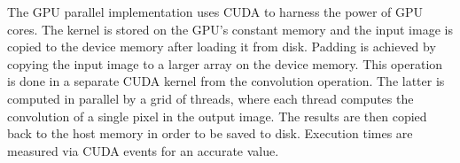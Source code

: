 The GPU parallel implementation uses CUDA to harness the power of GPU cores. The %
kernel is stored on the GPU's constant memory and the input image is copied to %
the device memory after loading it from disk. Padding is achieved by copying the %
input image to a larger array on the device memory. This operation is done in a %
separate CUDA kernel from the convolution operation. The latter is computed %
in parallel by a grid of threads, where each thread computes the convolution of %
a single pixel in the output image. The results are then copied back to the host %
memory in order to be saved to disk. Execution times are measured via CUDA events %
for an accurate value.
